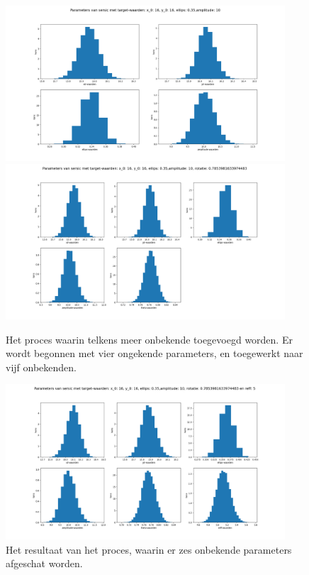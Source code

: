 \begin{figure}
    \begin{minipage}{0.95\textwidth}        
        \includegraphics[width=0.93\textwidth]{Figures/1_sersic_verschillende_parameters/sersic_parameters_metropolis_7500000_1500000_10_amplitude_0.png}
        \includegraphics[width=0.93\textwidth]{Figures/1_sersic_verschillende_parameters/sersic_parameters_metropolis_7500000_1500000_10_theta.png}
    \end{minipage}
    \caption{Het proces waarin telkens meer onbekende toegevoegd worden. Er wordt begonnen met vier ongekende parameters, en toegewerkt naar vijf onbekenden.}
    \label{fig:4 onbekenden}
\end{figure}
\begin{figure}
    \centering        
    \includegraphics[width=0.93\textwidth]{Figures/1_sersic_verschillende_parameters/sersic_parameters_metropolis_7500000_1500000_10_reff_0.png}
    \caption{Het resultaat van het proces, waarin er zes onbekende parameters afgeschat worden.}
    \label{fig:6 onbekenden}
\end{figure}
\newpage
\twocolumn
